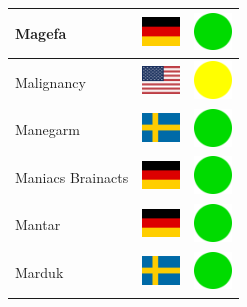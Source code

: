 \documentclass[12pt, a4paper, twoside]{report}
\begin{document}
\begin{center}
\begin{longtable}{|p{5cm}|p{2cm}|p{2cm}|}
 Magefa                                                     & \includegraphics[width=1cm]{4x3/de} &   \includegraphics[width=1cm]{likes/y} \\ \hline
 Malignancy                                                 & \includegraphics[width=1cm]{4x3/us} &   \includegraphics[width=1cm]{likes/m} \\ \hline
 Manegarm                                                   & \includegraphics[width=1cm]{4x3/se} &   \includegraphics[width=1cm]{likes/y} \\ \hline
 Maniacs Brainacts                                          & \includegraphics[width=1cm]{4x3/de} &   \includegraphics[width=1cm]{likes/y} \\ \hline
 Mantar                                                     & \includegraphics[width=1cm]{4x3/de} &   \includegraphics[width=1cm]{likes/y} \\ \hline
 Marduk                                                     & \includegraphics[width=1cm]{4x3/se} &   \includegraphics[width=1cm]{likes/y} \\ \hline

\end{longtable}
\end{center}
\end{document}
